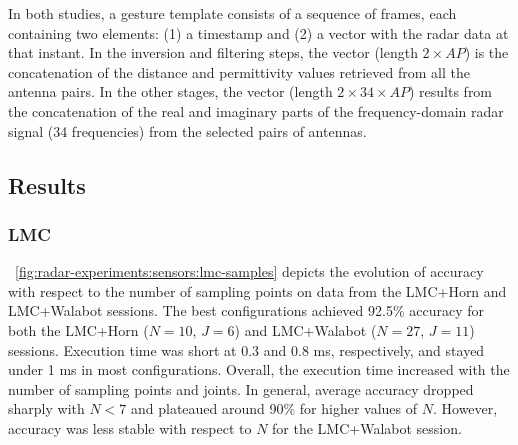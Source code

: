 In both studies, a gesture template consists of a sequence of frames, each containing two elements: (1) a timestamp and (2) a vector with the radar data at that instant. In the inversion and filtering steps, the vector (length $2 \times AP$) is the concatenation of the distance and permittivity values retrieved from all the antenna pairs. In the other stages, the vector (length $2 \times 34 \times AP$) results from the concatenation of the real and imaginary parts of the frequency-domain radar signal (34 frequencies) from the selected pairs of antennas.


\subsection{Results} \label{sec:radar-experiments:sensors:results}

\subsubsection{LMC} \label{sec:radar-experiments:sensors:results:lmc}
\fig~\ref{fig:radar-experiments:sensors:lmc-samples} depicts the evolution of accuracy with respect to the number of sampling points on data from the LMC+Horn and LMC+Walabot sessions.
%
The best configurations achieved 92.5\% accuracy for both the LMC+Horn ($N{=}10$, $J{=}6$) and LMC+Walabot ($N{=}27$, $J{=}11$) sessions.
Execution time was short at 0.3 and 0.8 ms, respectively, and stayed under 1 ms in most configurations. Overall, the execution time increased with the number of sampling points and joints.
%
In general, average accuracy dropped sharply with $N{<}7$ and plateaued around 90\% for higher values of $N$. However, accuracy was less stable with respect to $N$ for the LMC+Walabot session.

